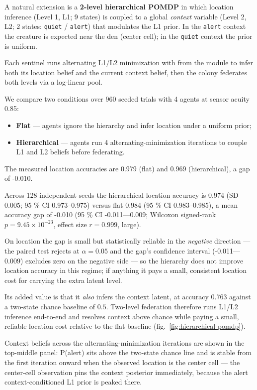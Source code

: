 \documentclass[
  english,
]{article}
\providecommand{\tightlist}{%
  \setlength{\itemsep}{0pt}\setlength{\parskip}{0pt}}
\theoremstyle{plain}
\theoremstyle{definition}
\theoremstyle{remark}
\theoremstyle{definition}
\begin{document}
A natural extension is a \textbf{2-level hierarchical POMDP} in which
location inference (Level 1, L1; 9 states) is coupled to a global
\emph{context} variable (Level 2, L2; 2 states: \texttt{quiet} /
\texttt{alert}) that modulates the L1 prior. In the \texttt{alert}
context the creature is expected near the den (center cell); in the
\texttt{quiet} context the prior is uniform.

Each sentinel runs alternating L1/L2 minimization with
 from the  module
to infer both its location belief and the current context belief, then
the colony federates both levels via a log-linear pool.

We compare two conditions over 960 seeded trials with 4 agents at sensor
acuity 0.85:

\begin{itemize}
\tightlist
\item
  \textbf{Flat} --- agents ignore the hierarchy and infer location under
  a uniform prior;
\item
  \textbf{Hierarchical} --- agents run 4 alternating-minimization
  iterations to couple L1 and L2 beliefs before federating.
\end{itemize}

The measured location accuracies are 0.979 (flat) and 0.969
(hierarchical), a gap of -0.010.

Across 128 independent seeds the hierarchical location accuracy is 0.974
(SD 0.005; 95 \% CI 0.973--0.975) versus flat 0.984 (95 \% CI
0.983--0.985), a mean accuracy gap of -0.010 (95 \% CI -0.011---0.009;
Wilcoxon signed-rank \(p = 9.45 \times 10^{-23}\), effect size
\(r = 0.999\), large).

On location the gap is small but statistically reliable in the
\emph{negative} direction --- the paired test rejects at
\(\alpha = 0.05\) and the gap's confidence interval (-0.011---0.009)
excludes zero on the negative side --- so the hierarchy does not improve
location accuracy in this regime; if anything it pays a small,
consistent location cost for carrying the extra latent level.

Its added value is that it \emph{also} infers the context latent, at
accuracy 0.763 against a two-state chance baseline of \(0.5\). Two-level
federation therefore runs L1/L2 inference end-to-end and resolves
context above chance while paying a small, reliable location cost
relative to the flat baseline (fig.~\ref{fig:hierarchical-pomdp}).

Context beliefs across the alternating-minimization iterations are shown
in the top-middle panel: P(alert) sits above the two-state chance line
and is stable from the first iteration onward when the observed location
is the center cell --- the center-cell observation pins the context
posterior immediately, because the alert context-conditioned L1 prior is
peaked there.
\end{document}
